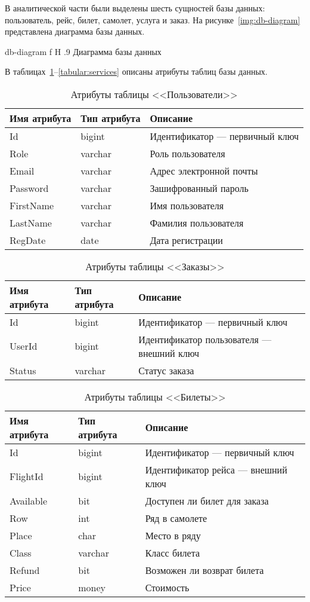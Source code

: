 \documentclass{bmstu}
\begin{document}
В аналитической части были выделены шесть сущностей базы данных: пользователь, рейс, билет, самолет, услуга и заказ. 
На рисунке~\ref{img:db-diagram} представлена диаграмма базы данных.

    {db-diagram}
    {f}
    {H}
    {.9\textwidth}
    {Диаграмма базы данных}

В таблицах~\ref{tabular:users}--\ref{tabular:services} описаны атрибуты таблиц базы данных.

\begin{table}[H]
\caption{Атрибуты таблицы <<Пользователи>>}
\label{tabular:users}
\begin{tabular}{|>{\raggedleft}p{4cm}|>{\raggedleft}p{3cm}|>{\raggedleft}p{8cm}|}
\hline
\textbf{Имя атрибута} & \textbf{Тип атрибута} & \textbf{Описание}
\tabularnewline
\hline
Id & bigint & Идентификатор --- первичный ключ
\tabularnewline
\hline
Role & varchar & Роль пользователя
\tabularnewline
\hline
Email & varchar & Адрес электронной почты
\tabularnewline
\hline
Password & varchar & Зашифрованный пароль
\tabularnewline
\hline
FirstName & varchar & Имя пользователя
\tabularnewline
\hline
LastName & varchar & Фамилия пользователя
\tabularnewline
\hline
RegDate & date & Дата регистрации
\tabularnewline
\hline
\end{tabular}
\end{table}

\begin{table}[H]
\caption{Атрибуты таблицы <<Заказы>>}
\label{tabular:orders}
\begin{tabular}{|>{\raggedleft}p{4cm}|>{\raggedleft}p{3cm}|>{\raggedleft}p{8cm}|}
\hline
\textbf{Имя атрибута} & \textbf{Тип атрибута} & \textbf{Описание}
\tabularnewline
\hline
Id & bigint & Идентификатор --- первичный ключ
\tabularnewline
\hline
UserId & bigint & Идентификатор пользователя --- внешний ключ
\tabularnewline
\hline
Status & varchar & Статус заказа
\tabularnewline
\hline
\end{tabular}
\end{table}

\begin{table}[H]
\caption{Атрибуты таблицы <<Билеты>>}
\label{tabular:tickets}
\begin{tabular}{|>{\raggedleft}p{4cm}|>{\raggedleft}p{3cm}|>{\raggedleft}p{8cm}|}
\hline
\textbf{Имя атрибута} & \textbf{Тип атрибута} & \textbf{Описание}
\tabularnewline
\hline
Id & bigint & Идентификатор --- первичный ключ
\tabularnewline
\hline
FlightId & bigint & Идентификатор рейса --- внешний ключ
\tabularnewline
\hline
Available & bit & Доступен ли билет для заказа
\tabularnewline
\hline
Row & int & Ряд в самолете
\tabularnewline
\hline
Place & char & Место в ряду
\tabularnewline
\hline
Class & varchar & Класс билета
\tabularnewline
\hline
Refund & bit & Возможен ли возврат билета
\tabularnewline
\hline
Price & money & Стоимость
\tabularnewline
\hline
\end{tabular}
\end{table}
\end{document}
